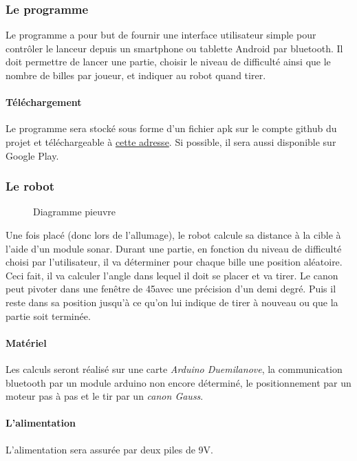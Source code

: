 \documentclass{article}
\begin{document}
\subsubsection{Le programme}
Le programme a pour but de fournir une interface utilisateur simple pour contrôler le lanceur depuis un smartphone ou tablette Android par bluetooth. Il doit permettre de lancer une partie, choisir le niveau de difficulté ainsi que le nombre de billes par joueur, et indiquer au robot quand tirer.
\paragraph{Téléchargement} Le programme sera stocké sous forme d'un fichier apk sur le compte github du projet et téléchargeable à \href{https://github.com/Lanceur-billes-TPE}{cette adresse}. Si possible, il sera aussi disponible sur Google Play.

\subsubsection{Le robot}
\begin{figure}
	\begin{center}
		
	\end{center}
	\caption{Diagramme pieuvre}
	\label{pieuvre}
\end{figure}

Une fois placé (donc lors de l'allumage), le robot calcule sa distance à la cible à l'aide d'un module sonar. Durant une partie, en fonction du niveau de difficulté choisi par l'utilisateur, il va déterminer pour chaque bille une position aléatoire. Ceci fait, il va calculer l'angle dans lequel il doit se placer et va tirer. Le canon peut pivoter dans une fenêtre de 45\degre avec une précision d'un demi degré. Puis il reste dans sa position jusqu'à ce qu'on lui indique de tirer à nouveau ou que la partie soit terminée.
\paragraph{Matériel} Les calculs seront réalisé sur une carte \emph{Arduino Duemilanove}, la communication bluetooth par un module arduino non encore déterminé, le positionnement par un moteur pas à pas et le tir par un \emph{canon Gauss}.
\paragraph{L'alimentation}
L'alimentation sera assurée par deux piles de 9V.
\end{document}
